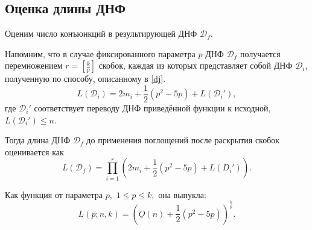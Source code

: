 \documentclass[12pt,a4paper,oneside,fleqn,leqno]{article}
\theoremstyle{definition}
\begin{document}
		\subsection{Оценка длины ДНФ}
			Оценим число конъюнкций в результирующей ДНФ $\mathcal{D}_f.$\par
			Напомним, что в случае фиксированного параметра $p$ ДНФ $\mathcal{D}_f$ получается перемножением $r = \left [ \frac{k}{p}\right ]$ скобок, каждая из которых представляет собой ДНФ $\mathcal{D}_i$, полученную по способу, описанному в \ref{dj}. 
			$$L(\mathcal{D}_i) = 2m_i + \frac{1}{2}(p^2 - 5p) + L(\mathcal{D}_i'),$$
			где $\mathcal{D}_i'$ соответствует переводу ДНФ приведённой функции к исходной, $L(\mathcal{D}_i') \leqslant n$.\par
			Тогда длина ДНФ $\mathcal{D}_f$ до применения поглощений после раскрытия скобок оценивается как
			$$
				L(\mathcal{D}_f) = \prod_{i = 1}^{r} \left(2m_i + \frac{1}{2}(p^2 - 5p) + L(D_i') \right).
			$$\par
			Как функция от параметра $p,\,\,1 \leqslant p \leqslant k,$ она выпукла:
			$$
				L(p; n, k) = \left( \underline{O}(n) + \frac{1}{2}(p^2 - 5p)\right)^{\frac{k}{p}}.
			$$
\end{document}
